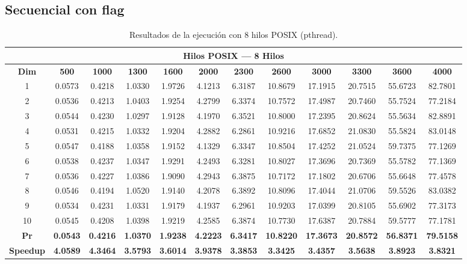 \documentclass{article}
\begin{document}

\subsection{Secuencial con flag}

\begin{table}[H]
\centering
\tiny
\begin{tabular}{|c|c|c|c|c|c|c|c|c|c|c|c|}
\hline
\multicolumn{12}{|c|}{\textbf{Hilos POSIX --- 8 Hilos}} \\
\hline
\textbf{Dim} & \textbf{500} & \textbf{1000} & \textbf{1300} & \textbf{1600} & \textbf{2000} & \textbf{2300} & \textbf{2600} & \textbf{3000} & \textbf{3300} & \textbf{3600} & \textbf{4000} \\
\hline
1  & 0.0573 & 0.4218 & 1.0330 & 1.9726 & 4.1213 & 6.3187 & 10.8679 & 17.1915 & 20.7515 & 55.6723 & 82.7801 \\
2  & 0.0536 & 0.4213 & 1.0403 & 1.9254 & 4.2799 & 6.3374 & 10.7572 & 17.4987 & 20.7460 & 55.7524 & 77.2184 \\
3  & 0.0544 & 0.4230 & 1.0297 & 1.9128 & 4.1970 & 6.3521 & 10.8000 & 17.2395 & 20.8624 & 55.5634 & 82.8891 \\
4  & 0.0531 & 0.4215 & 1.0332 & 1.9204 & 4.2882 & 6.2861 & 10.9216 & 17.6852 & 21.0830 & 55.5824 & 83.0148 \\
5  & 0.0547 & 0.4188 & 1.0358 & 1.9152 & 4.1329 & 6.3347 & 10.8504 & 17.4252 & 21.0524 & 59.7375 & 77.1269 \\
6  & 0.0538 & 0.4237 & 1.0347 & 1.9291 & 4.2493 & 6.3281 & 10.8027 & 17.3696 & 20.7369 & 55.5782 & 77.1369 \\
7  & 0.0536 & 0.4227 & 1.0386 & 1.9090 & 4.2943 & 6.3875 & 10.7172 & 17.1802 & 20.6706 & 55.6648 & 77.4578 \\
8  & 0.0546 & 0.4194 & 1.0520 & 1.9140 & 4.2078 & 6.3892 & 10.8096 & 17.4044 & 21.0706 & 59.5526 & 83.0382 \\
9  & 0.0534 & 0.4231 & 1.0331 & 1.9179 & 4.1937 & 6.2961 & 10.9203 & 17.0399 & 20.8105 & 55.6902 & 77.3173 \\
10 & 0.0545 & 0.4208 & 1.0398 & 1.9219 & 4.2585 & 6.3874 & 10.7730 & 17.6387 & 20.7884 & 59.5777 & 77.1781 \\
\hline
\textbf{Pr} & \textbf{0.0543} & \textbf{0.4216} & \textbf{1.0370} & \textbf{1.9238} & \textbf{4.2223} & \textbf{6.3417} & \textbf{10.8220} & \textbf{17.3673} & \textbf{20.8572} & \textbf{56.8371} & \textbf{79.5158} \\
\hline
\textbf{Speedup} & \textbf{4.0589} & \textbf{4.3464} & \textbf{3.5793} & \textbf{3.6014} & \textbf{3.9378} & \textbf{3.3853} & \textbf{3.3425} & \textbf{3.4357} & \textbf{3.5638} & \textbf{3.8923} & \textbf{3.8321} \\
\hline
\end{tabular}
\label{tab:t8}
\caption{Resultados de la ejecución con 8 hilos POSIX (pthread).}
\end{table}
\end{document}
